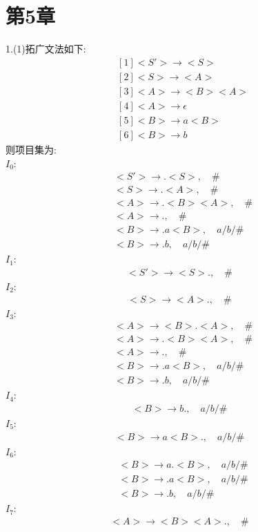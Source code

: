 \documentclass{article}
\begin{document}
\section{第5章}
1.(1)拓广文法如下:
\begin{align*}
    &[1] <S'> \to <S>  \\
    &[2] <S> \to <A> \\
    &[3] <A> \to <B><A> \\
    &[4] <A> \to \epsilon \\
    &[5] <B> \to a<B> \\
    &[6] <B> \to b
\end{align*}
则项目集为: \\
$I_0:$
\begin{align*}
    & <S'> \to .<S>,\quad \# \\
    & <S> \to .<A>,\quad \# \\
    & <A> \to .<B><A>,\quad \# \\
    & <A> \to .,\quad \# \\
    & <B> \to .a<B>,\quad a/b/\# \\
    & <B> \to .b,\quad a/b/\#
\end{align*}
$I_1:$
\begin{align*}
    <S'> \to <S>., \quad \#
\end{align*}
$I_2:$
\begin{align*}
    <S> \to <A>., \quad \#
\end{align*}
$I_3:$
\begin{align*}
    & <A> \to <B>.<A>, \quad \# \\
    & <A> \to .<B><A>, \quad \# \\
    & <A> \to ., \quad \# \\
    & <B> \to .a<B>, \quad a/b/\# \\
    & <B> \to .b, \quad a/b/\#
\end{align*}
$I_4:$
\begin{align*}
    <B> \to b., \quad a/b/\#
\end{align*}
$I_5:$
\begin{align*}
    <B> \to a<B>., \quad a/b/\#
\end{align*}
$I_6:$
\begin{align*}
    & <B> \to a.<B>, \quad a/b/\# \\
    & <B> \to .a<B>, \quad a/b/\# \\
    & <B> \to .b, \quad a/b/\#
\end{align*}
$I_7:$
\begin{align*}
    <A> \to <B><A>., \quad \#
\end{align*}
\\
\end{document}
